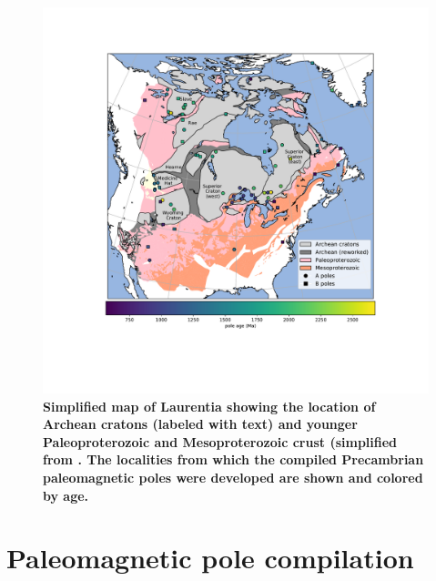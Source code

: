 \documentclass[11pt,letterpaper]{article}
\begin{document}

\begin{figure}
\centering
\includegraphics[width=6.5 in]{Figures/Fig1_map.pdf}
\caption{\small{\textbf{Simplified map of Laurentia showing the location of Archean cratons (labeled with text) and younger Paleoproterozoic and Mesoproterozoic crust (simplified from \cite{Whitmeyer2007a}. The localities from which the compiled Precambrian paleomagnetic poles were developed are shown and colored by age.}}}
\label{fig:Laurentia_map}
\end{figure}

\section{Paleomagnetic pole compilation}
\end{document}
